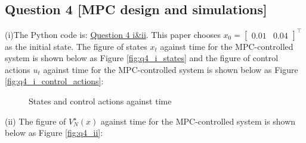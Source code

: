 \documentclass[a4paper,11pt,reqno]{amsart}
\newcommand{\tran}{\intercal}
\begin{document}
\subsection*{Question 4 [MPC design and simulations]}\label{sec:q4}
(i)The Python code is: \href{https://github.com/Gczmy/ELE8088/blob/main/Lab1/Python_code/Question4/Question4_i%26ii.py}{Question 4 i\&ii}. 
This paper chooses $x_0 = \begin{bmatrix} 0.01 & 0.04 \end{bmatrix}^{\tran}$ as the initial state. The figure of states $x_t$ against time for the MPC-controlled system is shown below as Figure \ref{fig:q4_i_states} 
and the figure of control actions $u_t$ against time for the MPC-controlled system is shown below as Figure \ref{fig:q4_i_control_actions}:
\begin{figure}[H]
    \centering
    \vspace{-0.35cm}
    \subfigtopskip=2pt
    \subfigbottomskip=2pt
    \subfigcapskip=-5pt
    \quad
    \caption{States and control actions against time}
    \label{fig:q4_i}
\end{figure}
(ii)
The figure of $V^{\star}_N(x)$ against time for the MPC-controlled system is shown below as Figure \ref{fig:q4_ii}:
\end{document}
